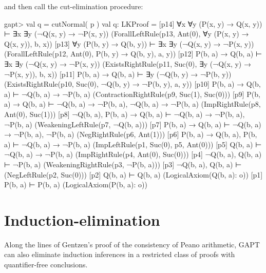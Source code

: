 \documentclass[a4paper,11pt]{book}
\begin{document}
%
and then call the cut-elimination procedure:
\begin{clilisting}
gapt> val q = cutNormal( p )
val q: LKProof = [p14] ∀x ∀y (P(x, y) → Q(x, y)) ⊢ ∃x ∃y (¬Q(x, y) → ¬P(x, y))    (ForallLeftRule(p13, Ant(0), ∀y (P(x, y) → Q(x, y)), b, x))
[p13] ∀y (P(b, y) → Q(b, y)) ⊢ ∃x ∃y (¬Q(x, y) → ¬P(x, y))    (ForallLeftRule(p12, Ant(0), P(b, y) → Q(b, y), a, y))
[p12] P(b, a) → Q(b, a) ⊢ ∃x ∃y (¬Q(x, y) → ¬P(x, y))    (ExistsRightRule(p11, Suc(0), ∃y (¬Q(x, y) → ¬P(x, y)), b, x))
[p11] P(b, a) → Q(b, a) ⊢ ∃y (¬Q(b, y) → ¬P(b, y))    (ExistsRightRule(p10, Suc(0), ¬Q(b, y) → ¬P(b, y), a, y))
[p10] P(b, a) → Q(b, a) ⊢ ¬Q(b, a) → ¬P(b, a)    (ContractionRightRule(p9, Suc(1), Suc(0)))
[p9] P(b, a) → Q(b, a) ⊢ ¬Q(b, a) → ¬P(b, a), ¬Q(b, a) → ¬P(b, a)    (ImpRightRule(p8, Ant(0), Suc(1)))
[p8] ¬Q(b, a), P(b, a) → Q(b, a) ⊢ ¬Q(b, a) → ¬P(b, a), ¬P(b, a)    (WeakeningLeftRule(p7, ¬Q(b, a)))
[p7] P(b, a) → Q(b, a) ⊢ ¬Q(b, a) → ¬P(b, a), ¬P(b, a)    (NegRightRule(p6, Ant(1)))
[p6] P(b, a) → Q(b, a), P(b, a) ⊢ ¬Q(b, a) → ¬P(b, a)    (ImpLeftRule(p1, Suc(0), p5, Ant(0)))
[p5] Q(b, a) ⊢ ¬Q(b, a) → ¬P(b, a)    (ImpRightRule(p4, Ant(0), Suc(0)))
[p4] ¬Q(b, a), Q(b, a) ⊢ ¬P(b, a)    (WeakeningRightRule(p3, ¬P(b, a)))
[p3] ¬Q(b, a), Q(b, a) ⊢     (NegLeftRule(p2, Suc(0)))
[p2] Q(b, a) ⊢ Q(b, a)    (LogicalAxiom(Q(b, a): o))
[p1] P(b, a) ⊢ P(b, a)    (LogicalAxiom(P(b, a): o))

\end{clilisting}

\section{Induction-elimination}

Along the lines of Gentzen's proof of the consistency of Peano arithmetic,
GAPT can also eliminate induction inferences in a restricted class of proofs
with quantifier-free conclusions.
\end{document}
